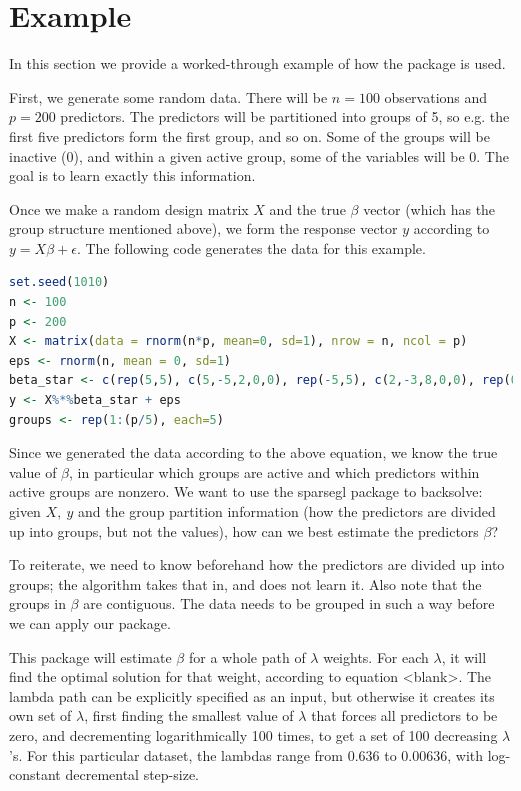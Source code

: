 \documentclass[titlepage]{article}
\begin{document}
\section{Example}

In this section we provide a worked-through example of how the package is used. 

First, we generate some random data. There will be $n=100$ observations and $p=200$ predictors. The predictors will be partitioned into groups of 5, so e.g. the first five predictors form the first group, and so on. Some of the groups will be inactive ($0$), and within a given active group, some of the variables will be $0$. The goal is to learn exactly this information.

Once we make a random design matrix $X$ and the true $\beta$ vector (which has the group structure mentioned above), we form the response vector $y$ according to $y=X\beta + \epsilon$. The following code generates the data for this example.

\begin{lstlisting}[language=R]
set.seed(1010)
n <- 100
p <- 200
X <- matrix(data = rnorm(n*p, mean=0, sd=1), nrow = n, ncol = p)
eps <- rnorm(n, mean = 0, sd=1)
beta_star <- c(rep(5,5), c(5,-5,2,0,0), rep(-5,5), c(2,-3,8,0,0), rep(0,(p-20)))
y <- X%*%beta_star + eps
groups <- rep(1:(p/5), each=5)
\end{lstlisting}

Since we generated the data according to the above equation, we know the true value of $\beta$, in particular which groups are active and which predictors within active groups are nonzero. We want to use the sparsegl package to backsolve: given $X,\ y$ and the group partition information (how the predictors are divided up into groups, but not the values), how can we best estimate the predictors $\beta$?

To reiterate, we need to know beforehand how the predictors are divided up into groups; the algorithm takes that in, and does not learn it. Also note that the groups in $\beta$ are contiguous. The data needs to be grouped in such a way before we can apply our package.

This package will estimate $\beta$ for a whole path of $\lambda$ weights. For each $\lambda$, it will find the optimal solution for that weight, according to equation <blank>. The lambda path can be explicitly specified as an input, but otherwise it creates its own set of $\lambda$, first finding the smallest value of $\lambda$ that forces all predictors to be zero, and decrementing logarithmically 100 times, to get a set of 100 decreasing $\lambda$'s. For this particular dataset, the lambdas range from $0.636$ to $0.00636$, with log-constant decremental step-size.
\end{document}
